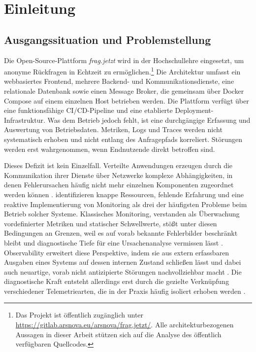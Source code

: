 
\chapter{Einleitung}
\label{ch:einleitung}

\section{Ausgangssituation und Problemstellung}
\label{sec:ausgangssituation}

Die Open-Source-Plattform \emph{frag.jetzt} wird in der Hochschullehre eingesetzt, um anonyme Rückfragen in Echtzeit zu ermöglichen.\footnote{Das Projekt ist öffentlich zugänglich unter \url{https://gitlab.arsnova.eu/arsnova/frag.jetzt/}. Alle architekturbezogenen Aussagen in dieser Arbeit stützen sich auf die Analyse des öffentlich verfügbaren Quellcodes.} Die Architektur umfasst ein webbasiertes Frontend, mehrere Backend- und Kommunikationsdienste, eine relationale Datenbank sowie einen Message Broker, die gemeinsam über Docker Compose auf einem einzelnen Host betrieben werden. Die Plattform verfügt über eine funktionsfähige CI/CD-Pipeline und eine etablierte Deployment-Infrastruktur. Was dem Betrieb jedoch fehlt, ist eine durchgängige Erfassung und Auswertung von Betriebsdaten. Metriken, Logs und Traces werden nicht systematisch erhoben und nicht entlang des Anfragepfads korreliert. Störungen werden erst wahrgenommen, wenn Endnutzende direkt betroffen sind.

Dieses Defizit ist kein Einzelfall. Verteilte Anwendungen erzeugen durch die Kommunikation ihrer Dienste über Netzwerke komplexe Abhängigkeiten, in denen Fehlerursachen häufig nicht mehr einzelnen Komponenten zugeordnet werden können \parencite[S.~1]{mahida2023enhancing}. \textcite[S.~9]{Niedermaier2019onObservability} identifizieren knappe Ressourcen, fehlende Erfahrung und eine reaktive Implementierung von Monitoring als drei der häufigsten Probleme beim Betrieb solcher Systeme. Klassisches Monitoring, verstanden als Überwachung vordefinierter Metriken und statischer Schwellwerte, stößt unter diesen Bedingungen an Grenzen, weil es auf vorab bekannte Fehlerbilder beschränkt bleibt und diagnostische Tiefe für eine Ursachenanalyse vermissen lässt \parencite[S.~602]{hallur2024monitoring}. Observability erweitert diese Perspektive, indem sie aus extern erfassbaren Ausgaben eines Systems auf dessen internen Zustand schließen lässt und dabei auch neuartige, vorab nicht antizipierte Störungen nachvollziehbar macht \parencite[S.~86907]{usman2022survey}. Die diagnostische Kraft entsteht allerdings erst durch die gezielte Verknüpfung verschiedener Telemetriearten, die in der Praxis häufig isoliert erhoben werden \parencite[S.~1--4]{tzanettis2022data}.

